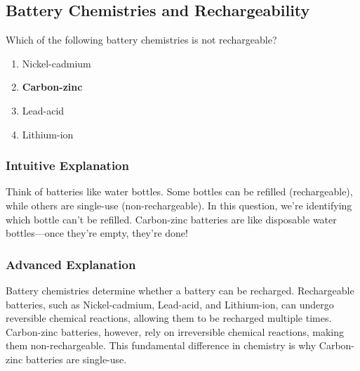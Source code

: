 \subsection{Battery Chemistries and Rechargeability}
\label{T6A11}

\begin{tcolorbox}[colback=gray!10!white,colframe=black!75!black,title=T6A11]
Which of the following battery chemistries is not rechargeable?
\begin{enumerate}[noitemsep]
    \item Nickel-cadmium
    \item \textbf{Carbon-zinc}
    \item Lead-acid
    \item Lithium-ion
\end{enumerate}
\end{tcolorbox}

\subsubsection*{Intuitive Explanation}
Think of batteries like water bottles. Some bottles can be refilled (rechargeable), while others are single-use (non-rechargeable). In this question, we're identifying which bottle can't be refilled. Carbon-zinc batteries are like disposable water bottles—once they're empty, they're done!

\subsubsection*{Advanced Explanation}
Battery chemistries determine whether a battery can be recharged. Rechargeable batteries, such as Nickel-cadmium, Lead-acid, and Lithium-ion, can undergo reversible chemical reactions, allowing them to be recharged multiple times. Carbon-zinc batteries, however, rely on irreversible chemical reactions, making them non-rechargeable. This fundamental difference in chemistry is why Carbon-zinc batteries are single-use.